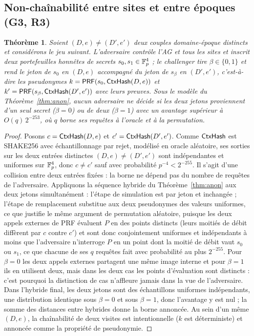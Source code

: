 \documentclass[11pt]{article}
\newtheorem{theorem}{Th\'eor\`eme}
\theoremstyle{definition}
\begin{document}
\subsection{Non-chaînabilité entre sites et entre époques (G3, R3)}

\begin{theorem}
\label{thm:unlink}
Soient $(D, e) \ne (D', e')$ deux couples domaine-époque distincts et considérons le jeu
suivant. L'adversaire contrôle l'AG et tous les sites et inscrit deux portefeuilles
honnêtes de secrets $s_0, s_1 \in \mathbb{F}_p^4$ ; le challenger tire $\beta \in \{0,1\}$ et rend
le jeton de $s_0$ en $(D, e)$ accompagné du jeton de $s_\beta$ en $(D', e')$, c'est-à-dire
les pseudonymes $k = \mathsf{PRF}(s_0, \mathsf{CtxHash}(D, e))$ et $k' = \mathsf{PRF}(s_\beta, \mathsf{CtxHash}(D', e'))$
avec leurs preuves. Sous le modèle du Théorème~\ref{thm:anon}, aucun adversaire ne décide
si les deux jetons proviennent d'un seul secret ($\beta = 0$) ou de deux ($\beta = 1$)
avec un avantage supérieur à $O(q)\,2^{-253}$, où $q$ borne ses requêtes à l'oracle et à
la permutation.
\end{theorem}

\begin{proof}
Posons $c = \mathsf{CtxHash}(D, e)$ et $c' = \mathsf{CtxHash}(D', e')$. Comme $\mathsf{CtxHash}$ est SHAKE256 avec
échantillonnage par rejet, modélisé en oracle aléatoire, ses sorties sur les deux entrées
distinctes $(D, e) \ne (D', e')$ sont indépendantes et uniformes sur $\mathbb{F}_p^4$, donc $c \ne
c'$ sauf avec probabilité $p^{-4} < 2^{-255}$. Il s'agit d'une collision entre deux
entrées fixées : la borne ne dépend pas du nombre de requêtes de l'adversaire.
Appliquons la séquence
hybride du Théorème~\ref{thm:anon} aux deux jetons simultanément : l'étape de simulation
est par jeton et inchangée ; l'étape de remplacement substitue aux deux pseudonymes des
valeurs uniformes, ce que justifie le même argument de permutation aléatoire, puisque les
deux appels externes de PRF évaluent $P$ en des points distincts (leurs moitiés de débit
diffèrent par $c$ contre $c'$) et sont donc conjointement uniformes et indépendants à
moins que l'adversaire n'interroge $P$ en un point dont la moitié de débit vaut $s_0$ ou
$s_1$, ce que chacune de ses $q$ requêtes fait avec probabilité au plus $2^{-255}$. Pour
$\beta = 0$ les deux appels externes partagent une même image interne et pour $\beta = 1$
ils en utilisent deux, mais dans les deux cas les points d'évaluation sont distincts :
c'est pourquoi la distinction de cas n'affleure jamais dans la vue de l'adversaire. Dans
l'hybride final,
les deux jetons sont des échantillons uniformes indépendants, une distribution identique
sous $\beta = 0$ et sous $\beta = 1$, donc l'avantage y est nul ; la somme des distances
entre hybrides donne la borne annoncée. Au sein d'un même $(D, e)$, la chaînabilité de deux visites est
intentionnelle ($k$ est déterministe) et annoncée comme la propriété de pseudonymie.
\end{proof}
\end{document}
